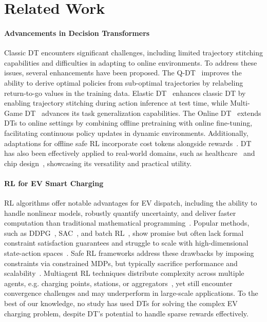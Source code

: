 \section{Related Work}
\paragraph{Advancements in Decision Transformers}
Classic DT encounters significant challenges, including limited trajectory stitching capabilities and difficulties in adapting to online environments. To address these issues, several enhancements have been proposed. The Q-DT~\cite{qdt} improves the ability to derive optimal policies from sub-optimal trajectories by relabeling return-to-go values in the training data. Elastic DT~\cite{10.5555/3666122.3666936} enhances classic DT by enabling trajectory stitching during action inference at test time, while Multi-Game DT~\cite{10.5555/3600270.3602295} advances its task generalization capabilities. The Online DT~\cite{online_dt,3056976d4116471a86ab3fa345b1695d} extends DTs to online settings by combining offline pretraining with online fine-tuning, facilitating continuous policy updates in dynamic environments. Additionally, adaptations for offline safe RL incorporate cost tokens alongside rewards~\cite{liu2023constrained, pmlr-v238-hong24a}. DT has also been effectively applied to real-world domains, such as healthcare~\cite{Zhang2023} and chip design~\cite{pmlr-v202-lai23c}, showcasing its versatility and practical utility.

\paragraph{RL for EV Smart Charging}
RL algorithms offer notable advantages for EV dispatch, including the ability to handle nonlinear models, robustly quantify uncertainty, and deliver faster computation than traditional mathematical programming~\cite{QIU2023113052}. Popular methods, such as DDPG~\cite{JIN2022120140}, SAC~\cite{9211734}, and batch RL~\cite{8727484}, show promise but often lack formal constraint satisfaction guarantees and struggle to scale with high-dimensional state-action spaces~\cite{isgt2024, 9465776}. Safe RL frameworks address these drawbacks by imposing constraints via constrained MDPs, but typically sacrifice performance and scalability~\cite{ZHANG2023121490, chen2022deep}. Multiagent RL techniques distribute complexity across multiple agents, e.g. charging points, stations, or aggregators~\cite{KAMRANI2025100620}, yet still encounter convergence challenges and may underperform in large-scale applications. 
To the best of our knowledge, no study has used DTs for solving the complex EV charging problem, despite DT's potential to handle sparse rewards effectively.